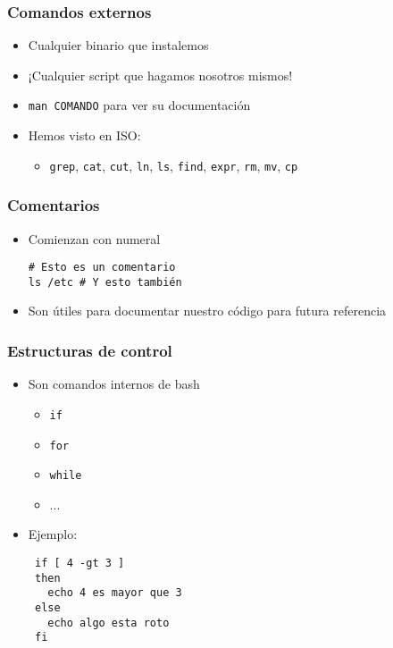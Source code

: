 \begin{frame}
  \frametitle{Comandos externos}
  \begin{itemize}
    \item Cualquier binario que instalemos
    \item ¡Cualquier script que hagamos nosotros mismos!
    \item \texttt{man COMANDO} para ver su documentación
    \item Hemos visto en ISO:
    \begin{itemize}
      \item \texttt{grep}, \texttt{cat}, \texttt{cut}, \texttt{ln}, \texttt{ls},
        \texttt{find}, \texttt{expr}, \texttt{rm}, \texttt{mv}, \texttt{cp}
    \end{itemize}
  \end{itemize}
\end{frame}

\begin{frame}[fragile]
  \frametitle{Comentarios}
  \begin{itemize}
    \item Comienzan con numeral
    \begin{lstlisting}
# Esto es un comentario
ls /etc # Y esto también
    \end{lstlisting}
    \item Son útiles para documentar nuestro código para futura referencia
  \end{itemize}
\end{frame}

\begin{frame}[fragile]
  \frametitle{Estructuras de control}
  \begin{itemize}
    \item Son comandos internos de bash
    \begin{itemize}
      \item \texttt{if}
      \item \texttt{for}
      \item \texttt{while}
      \item ...
    \end{itemize}
    \item Ejemplo:
   \begin{lstlisting}
 if [ 4 -gt 3 ]
 then
   echo 4 es mayor que 3
 else
   echo algo esta roto
 fi
   \end{lstlisting}
  \end{itemize}
\end{frame}

